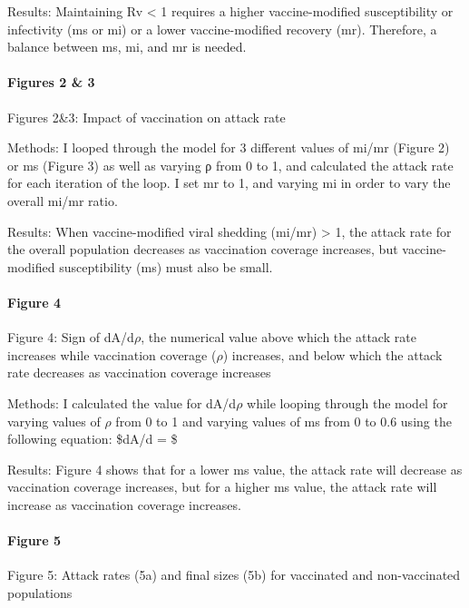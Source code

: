 \documentclass[]{article}
\let\oldparagraph\paragraph
\renewcommand{\paragraph}[1]{\oldparagraph{#1}\mbox{}}
\begin{document}
Results: Maintaining Rv \textless{} 1 requires a higher vaccine-modified
susceptibility or infectivity (ms or mi) or a lower vaccine-modified
recovery (mr). Therefore, a balance between ms, mi, and mr is needed.

\hypertarget{figures-2-3}{%
\paragraph{Figures 2 \& 3}\label{figures-2-3}}

Figures 2\&3: Impact of vaccination on attack rate

Methods: I looped through the model for 3 different values of mi/mr
(Figure 2) or ms (Figure 3) as well as varying ρ from 0 to 1, and
calculated the attack rate for each iteration of the loop. I set mr to
1, and varying mi in order to vary the overall mi/mr ratio.

Results: When vaccine-modified viral shedding (mi/mr) \textgreater{} 1,
the attack rate for the overall population decreases as vaccination
coverage increases, but vaccine-modified susceptibility (ms) must also
be small.

\hypertarget{figure-4}{%
\paragraph{Figure 4}\label{figure-4}}

Figure 4: Sign of dA/d\(\rho\), the numerical value above which the
attack rate increases while vaccination coverage (\(\rho\)) increases,
and below which the attack rate decreases as vaccination coverage
increases

Methods: I calculated the value for dA/d\(\rho\) while looping through
the model for varying values of \(\rho\) from 0 to 1 and varying values
of ms from 0 to 0.6 using the following equation: \$dA/d \rho = \$

Results: Figure 4 shows that for a lower ms value, the attack rate will
decrease as vaccination coverage increases, but for a higher ms value,
the attack rate will increase as vaccination coverage increases.

\hypertarget{figure-5}{%
\paragraph{Figure 5}\label{figure-5}}

Figure 5: Attack rates (5a) and final sizes (5b) for vaccinated and
non-vaccinated populations
\end{document}
